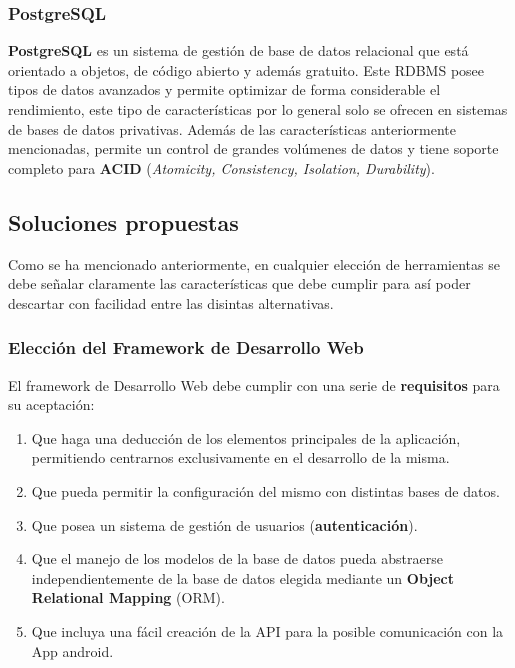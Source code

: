     \subsubsection{PostgreSQL}
    \textbf{PostgreSQL} \cite{postgresql} es un sistema de gestión de base de datos relacional
    que está orientado a objetos, de código abierto y además gratuito. Este RDBMS posee tipos
    de datos avanzados y permite optimizar de forma considerable el rendimiento, este tipo de
    características por lo general solo se ofrecen en sistemas de bases de datos privativas.
    Además de las características anteriormente mencionadas, permite un control de grandes
    volúmenes de datos y tiene soporte completo para \textbf{ACID} (\textit{Atomicity,
    Consistency, Isolation, Durability}).

\subsection{Soluciones propuestas}
Como se ha mencionado anteriormente, en cualquier elección de herramientas se debe señalar
claramente las características que debe cumplir para así poder descartar con facilidad
entre las disintas alternativas.

    \subsubsection{Elección del Framework de Desarrollo Web}
    El framework de Desarrollo Web debe cumplir con una serie de \textbf{requisitos} para
    su aceptación:

        \begin{enumerate}
            \item Que haga una deducción de los elementos principales de la aplicación,
            permitiendo centrarnos exclusivamente en el desarrollo de la misma.
            \item Que pueda permitir la configuración del mismo con distintas bases de
            datos.
            \item Que posea un sistema de gestión de usuarios (\textbf{autenticación}).
            \item Que el manejo de los modelos de la base de datos pueda abstraerse
            independientemente de la base de datos elegida mediante un \textbf{Object
            Relational Mapping} (ORM).
            \item Que incluya una fácil creación de la API para la posible comunicación
            con la App android.
        \end{enumerate}

